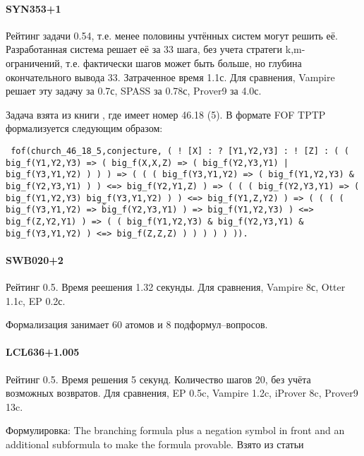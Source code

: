 
\paragraph{SYN353+1} Рейтинг задачи 0.54, т.е. менее половины учтённых систем могут решить её.
Разработанная система решает её за 33 шага, без учета стратеги k,m-ограничений, т.е. фактически шагов может быть больше, но глубина окончательного вывода 33. Затраченное время 1.1с. Для сравнения, Vampire решает эту задачу за 0.7с, SPASS за 0.78с, Prover9 за 4.0с.

Задача взята из книги \cite{Church1}, где имеет номер  46.18 (5). В формате FOF TPTP формализуется следующим образом:

\texttt{
fof(church\_46\_18\_5,conjecture,
    ( ! [X] :
      ? [Y1,Y2,Y3] :
      ! [Z] :
        ( ( big\_f(Y1,Y2,Y3)
         => ( big\_f(X,X,Z)
           => ( big\_f(Y2,Y3,Y1)
              | big\_f(Y3,Y1,Y2) ) ) )
       => ( ( ( big\_f(Y3,Y1,Y2)
             => ( big\_f(Y1,Y2,Y3)
                \& big\_f(Y2,Y3,Y1) ) )
          <=> big\_f(Y2,Y1,Z) )
         => ( ( ( big\_f(Y2,Y3,Y1)
               => ( big\_f(Y1,Y2,Y3)
                   big\_f(Y3,Y1,Y2) ) )
            <=> big\_f(Y1,Z,Y2) )
           => ( ( ( ( big\_f(Y3,Y1,Y2)
                   => \~ big\_f(Y2,Y3,Y1) )
                 => big\_f(Y1,Y2,Y3) )
              <=> big\_f(Z,Y2,Y1) )
             => ( ( big\_f(Y1,Y2,Y3)
                  \& big\_f(Y2,Y3,Y1)
                  \& big\_f(Y3,Y1,Y2) )
              <=> big\_f(Z,Z,Z) ) ) ) ) ) )).}



\paragraph{SWB020+2} 
Рейтинг 0.5. Время реешения 1.32 секунды. Для сравнения, Vampire 8с, Otter 1.1c, EP 0.2с.

Формализация занимает 60 атомов и 8 подформул--вопросов. 

\paragraph{LCL636+1.005}
Рейтинг 0.5. Время решения 5 секунд. Количество шагов 20, без учёта возможных возвратов. Для сравнения, EP 0.5c, Vampire 1.2c, iProver 8c, Prover9 13c.

Формулировка: The branching formula plus a negation symbol in front and an additional subformula to make the formula provable.
Взято из статьи \cite{SourceLCL}

